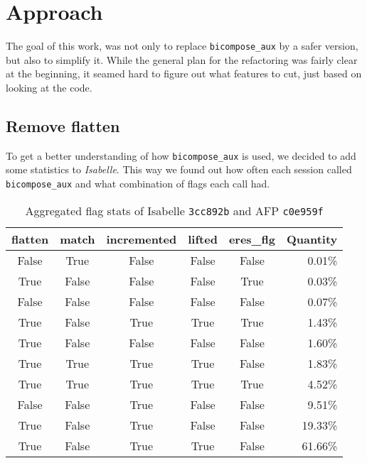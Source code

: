 \chapter{Approach}\label{chapter:approach}

The goal of this work, was not only to replace \texttt{bicompose\_aux} by a safer version, but also to simplify it. While the general plan for the refactoring was fairly clear at the beginning, it seamed hard to figure out what features to cut, just based on looking at the code.

\section{Remove flatten}

To get a better understanding of how \texttt{bicompose\_aux} is used, we decided to add some statistics to \textit{Isabelle}. This way we found out how often each session called \texttt{bicompose\_aux} and what combination of flags each call had.

\begin{table}[ht]
\caption{Aggregated flag stats of Isabelle \texttt{3cc892b} and AFP \texttt{c0e959f}}
\begin{tabular}{*{5}{c} r}
flatten & match & incremented & lifted & eres\_flg & Quantity\\ \hline
False & True & False & False & False & 0.01\%\\
True & False & False & False & True & 0.03\%\\
False & False & False & False & False & 0.07\%\\
True & False & True & True & True & 1.43\%\\
True & False & False & False & False & 1.60\%\\
True & True & True & True & False & 1.83\%\\
True & True & True & True & True & 4.52\%\\
False & False & True & False & False & 9.51\%\\
True & False & True & False & False & 19.33\%\\
True & False & True & True & False & 61.66\%\\
\end{tabular}
\label{tab:agg_baseline}
\centering
\end{table}


